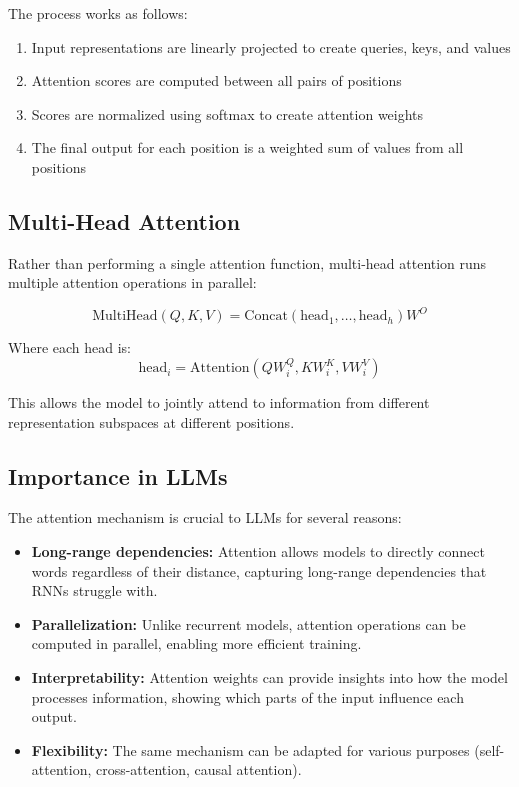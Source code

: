 \documentclass[11pt,a4paper]{report}
\begin{document}
The process works as follows:
\begin{enumerate}
    \item Input representations are linearly projected to create queries, keys, and values
    \item Attention scores are computed between all pairs of positions
    \item Scores are normalized using softmax to create attention weights
    \item The final output for each position is a weighted sum of values from all positions
\end{enumerate}

\subsection{Multi-Head Attention}
Rather than performing a single attention function, multi-head attention runs multiple attention operations in parallel:

\begin{equation}
\text{MultiHead}(Q, K, V) = \text{Concat}(\text{head}_1, \ldots, \text{head}_h)W^O
\end{equation}

Where each head is:
\begin{equation}
\text{head}_i = \text{Attention}(QW_i^Q, KW_i^K, VW_i^V)
\end{equation}

This allows the model to jointly attend to information from different representation subspaces at different positions.

\subsection{Importance in LLMs}
The attention mechanism is crucial to LLMs for several reasons:

\begin{itemize}
    \item \textbf{Long-range dependencies:} Attention allows models to directly connect words regardless of their distance, capturing long-range dependencies that RNNs struggle with.
    
    \item \textbf{Parallelization:} Unlike recurrent models, attention operations can be computed in parallel, enabling more efficient training.
    
    \item \textbf{Interpretability:} Attention weights can provide insights into how the model processes information, showing which parts of the input influence each output.
    
    \item \textbf{Flexibility:} The same mechanism can be adapted for various purposes (self-attention, cross-attention, causal attention).
\end{itemize}
\end{document}
